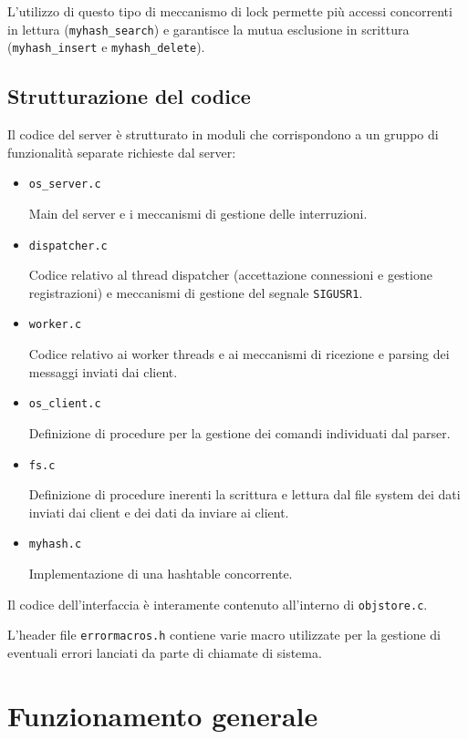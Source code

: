 \documentclass[a4paper,11pt]{article}
\begin{document}
L'utilizzo di questo tipo di meccanismo di lock permette più accessi concorrenti in lettura (\texttt{myhash\_search}) e garantisce
la mutua esclusione in scrittura (\texttt{myhash\_insert} e \texttt{myhash\_delete}). 

\newpage
\subsection{Strutturazione del codice}
Il codice del server è strutturato in moduli che corrispondono a un gruppo di funzionalità separate richieste dal server:
\begin{itemize}
    \item \texttt{os\_server.c}
    
    Main del server e i meccanismi di gestione delle interruzioni.
    \item \texttt{dispatcher.c}
    
    Codice relativo al thread dispatcher (accettazione connessioni e gestione registrazioni) e meccanismi di gestione del segnale \texttt{SIGUSR1}.
    \item \texttt{worker.c}
    
    Codice relativo ai worker threads e ai meccanismi di ricezione e parsing dei messaggi inviati dai client.

    \item \texttt{os\_client.c}
    
    Definizione di procedure per la gestione dei comandi individuati dal parser.
    
    \item \texttt{fs.c}
    
    Definizione di procedure inerenti la scrittura e lettura dal file system dei dati inviati dai client e dei dati da inviare ai client.
    
    \item \texttt{myhash.c}
    
    Implementazione di una hashtable concorrente.
\end{itemize}
\smallskip
Il codice dell'interfaccia è interamente contenuto all'interno di \texttt{objstore.c}.

L'header file \texttt{errormacros.h} contiene varie macro utilizzate per la gestione di eventuali errori lanciati da parte di chiamate di sistema.
\section{Funzionamento generale}
\end{document}
